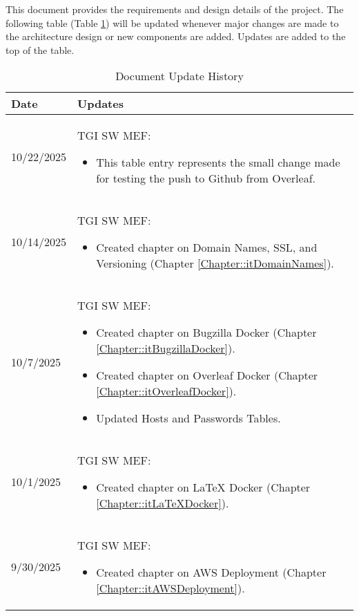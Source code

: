 This document provides the requirements and design details of the
project.  The following table (Table \ref{Table::UpdateHistory}) will be
updated whenever major changes are made to the architecture
design or new components are added. Updates are added to the top of the table.

\begin{longtable}{|l||p{13.5cm}|}
\caption{Document Update History \label{Table::UpdateHistory}}\\
\hline
\textbf{Date} & \textbf{Updates} \\
\hline 
\endhead

10/22/2025 & TGI SW MEF:
\begin{itemize}[topsep=0pt,itemsep=0pt,parsep=0pt,partopsep=0pt,leftmargin=12pt]
\item This table entry represents the small change made for testing the push to Github from Overleaf.
\end{itemize}
\\ \hline

10/14/2025 & TGI SW MEF:
\begin{itemize}[topsep=0pt,itemsep=0pt,parsep=0pt,partopsep=0pt,leftmargin=12pt]
\item Created chapter on Domain Names, SSL, and Versioning (Chapter \ref{Chapter::itDomainNames}).
\end{itemize}
\\ \hline

10/7/2025 & TGI SW MEF:
\begin{itemize}[topsep=0pt,itemsep=0pt,parsep=0pt,partopsep=0pt,leftmargin=12pt]
\item Created chapter on Bugzilla Docker (Chapter \ref{Chapter::itBugzillaDocker}).
\item Created chapter on Overleaf Docker (Chapter \ref{Chapter::itOverleafDocker}).
\item Updated Hosts and Passwords Tables.
\end{itemize}
\\ \hline

10/1/2025 & TGI SW MEF:
\begin{itemize}[topsep=0pt,itemsep=0pt,parsep=0pt,partopsep=0pt,leftmargin=12pt]
\item Created chapter on LaTeX Docker (Chapter \ref{Chapter::itLaTeXDocker}).
\end{itemize}
\\ \hline

9/30/2025 & TGI SW MEF:
\begin{itemize}[topsep=0pt,itemsep=0pt,parsep=0pt,partopsep=0pt,leftmargin=12pt]
\item Created chapter on AWS Deployment (Chapter \ref{Chapter::itAWSDeployment}).
\end{itemize}
\\ \hline


\end{longtable}
